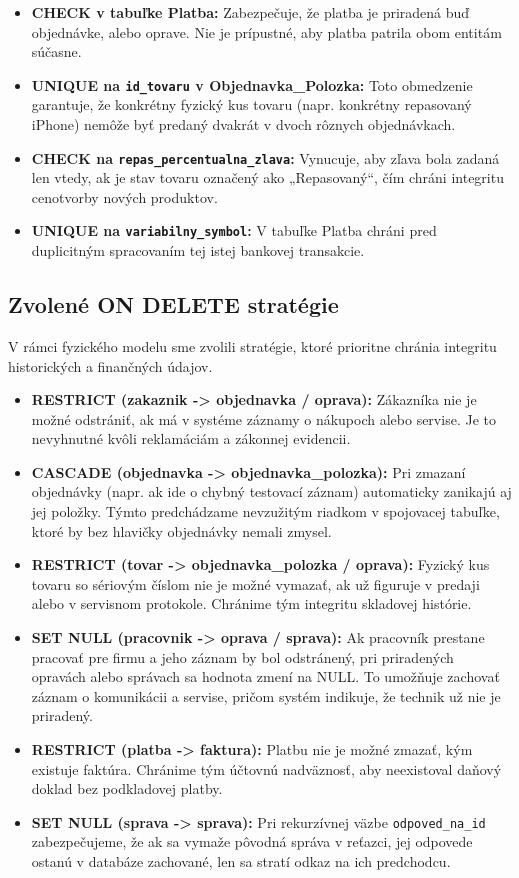\documentclass[11pt, a4paper]{article}
\begin{document}
\begin{itemize}
    \item \textbf{CHECK v tabuľke Platba:} Zabezpečuje, že platba je priradená buď objednávke, alebo oprave. Nie je prípustné, aby platba patrila obom entitám súčasne.
    \item \textbf{UNIQUE na \texttt{id\_tovaru} v Objednavka\_Polozka:} Toto obmedzenie garantuje, že konkrétny fyzický kus tovaru (napr. konkrétny repasovaný iPhone) nemôže byť predaný dvakrát v dvoch rôznych objednávkach.
    \item \textbf{CHECK na \texttt{repas\_percentualna\_zlava}:} Vynucuje, aby zľava bola zadaná len vtedy, ak je stav tovaru označený ako „Repasovaný“, čím chráni integritu cenotvorby nových produktov.
    \item \textbf{UNIQUE na \texttt{variabilny\_symbol}:} V tabuľke Platba chráni pred duplicitným spracovaním tej istej bankovej transakcie.
\end{itemize}

\subsection{Zvolené ON DELETE stratégie}
V rámci fyzického modelu sme zvolili stratégie, ktoré prioritne chránia integritu historických a finančných údajov.

\begin{itemize}
    \item \textbf{RESTRICT (zakaznik -> objednavka / oprava):} Zákazníka nie je možné odstrániť, ak má v systéme záznamy o nákupoch alebo servise. Je to nevyhnutné kvôli reklamáciám a zákonnej evidencii.
    \item \textbf{CASCADE (objednavka -> objednavka\_polozka):} Pri zmazaní objednávky (napr. ak ide o chybný testovací záznam) automaticky zanikajú aj jej položky. Týmto predchádzame nevzužitým riadkom v spojovacej tabuľke, ktoré by bez hlavičky objednávky nemali zmysel.
    \item \textbf{RESTRICT (tovar -> objednavka\_polozka / oprava):} Fyzický kus tovaru so sériovým číslom nie je možné vymazať, ak už figuruje v predaji alebo v servisnom protokole. Chránime tým integritu skladovej histórie.
    \item \textbf{SET NULL (pracovnik -> oprava / sprava):} Ak pracovník prestane pracovať pre firmu a jeho záznam by bol odstránený, pri priradených opravách alebo správach sa hodnota zmení na NULL. To umožňuje zachovať záznam o komunikácii a servise, pričom systém indikuje, že technik už nie je priradený.
    \item \textbf{RESTRICT (platba -> faktura):} Platbu nie je možné zmazať, kým existuje faktúra. Chránime tým účtovnú nadväznosť, aby neexistoval daňový doklad bez podkladovej platby.
    \item \textbf{SET NULL (sprava -> sprava):} Pri rekurzívnej väzbe \texttt{odpoved\_na\_id} zabezpečujeme, že ak sa vymaže pôvodná správa v reťazci, jej odpovede ostanú v databáze zachované, len sa stratí odkaz na ich predchodcu.
\end{itemize}
\end{document}
